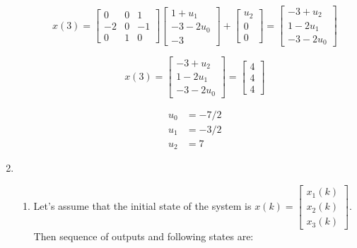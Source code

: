 \documentclass[12pt,a4paper, margin=1in]{article}
\begin{document}
\begin{enumerate}[label=\textbf{\arabic*.}]
\begin{enumerate}
                \begin{equation*}
                    x(3) = \begin{bmatrix}
                        0 & 0 & 1 \\
                        -2 & 0 & -1 \\
                        0 & 1 & 0
                    \end{bmatrix} \begin{bmatrix}
                        1 + u_1 \\ -3 - 2u_0 \\ -3
                    \end{bmatrix} + \begin{bmatrix}
                        u_2 \\ 0 \\ 0
                    \end{bmatrix} = \begin{bmatrix}
                        -3 + u_2 \\ 1-2u_1 \\ -3-2u_0
                    \end{bmatrix}
                \end{equation*}

                \begin{equation*}
                    x(3) = \begin{bmatrix}
                        -3 + u_2 \\ 1-2u_1 \\ -3-2u_0
                    \end{bmatrix} = \begin{bmatrix}
                        4 \\ 4 \\ 4
                    \end{bmatrix}
                \end{equation*}

                \begin{align*}
                    u_0 &= -7/2 \\
                    u_1 &= -3/2 \\
                    u_2 &= 7
                \end{align*}
                
        \end{enumerate}
        
        
    \item %
        \begin{enumerate}
            \item 
                Let's assume that the initial state of the system is $x(k) = \begin{bmatrix}
                    x_1(k) \\ x_2(k) \\ x_3(k)
                \end{bmatrix}$. Then sequence of outputs and following states are:
                


\end{enumerate}
\end{enumerate}
\end{document}
